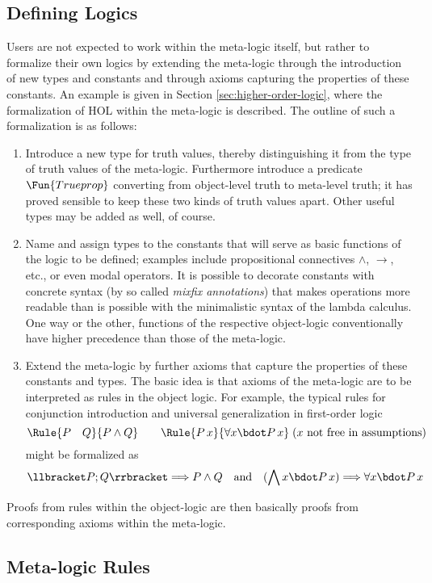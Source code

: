 \subsection{Defining Logics}
\label{sec:defining-logics}

Users are not expected to work within the meta-logic itself, but rather to
formalize their own logics by extending the meta-logic through the introduction
of new types and constants and through axioms capturing the properties of these
constants. An example is given in Section \ref{sec:higher-order-logic}, where
the formalization of HOL within the meta-logic is described. The outline of such
a formalization is as follows:
\begin{enumerate}
\item Introduce a new type for truth values, thereby distinguishing it from the
  type of truth values of the meta-logic. Furthermore introduce a predicate
  $\Fun{Trueprop}$ converting from object-level truth to meta-level truth; it
  has proved sensible to keep these two kinds of truth values apart. Other
  useful types may be added as well, of course.
\item Name and assign types to the constants that will serve as basic functions
  of the logic to be defined; examples include propositional connectives $\land$,
  $\longrightarrow$, etc., or even modal operators. It is possible to decorate constants with
  concrete syntax (by so called \emph{mixfix annotations}) that makes
  operations more readable than is possible with the minimalistic syntax of the
  lambda calculus. One way or the other, functions of the respective object-logic
  conventionally have higher precedence than those of the meta-logic.
\item Extend the meta-logic by further axioms that capture the properties of
  these constants and types. The basic idea is that axioms of the meta-logic are to be
  interpreted as rules in the object logic. For example, the typical
  rules for conjunction introduction and universal generalization in first-order
  logic 
  \[ \Rule{P\quad Q}{P \land Q}\qquad \Rule{P\, x}{\forall x\bdot P\, x}\;\text{($x$ not
    free in assumptions)}\]
  might be formalized as 
  \[ \llbracket P; Q\rrbracket \Longrightarrow P \land Q\quad\text{and}\quad (\bigwedge x\bdot P\, x) \Longrightarrow \forall x\bdot P\, x \]
\end{enumerate}
Proofs from rules within the object-logic are then basically proofs from
corresponding axioms within the meta-logic.


\subsection{Meta-logic Rules}
\label{sec:meta-logic-rules}


